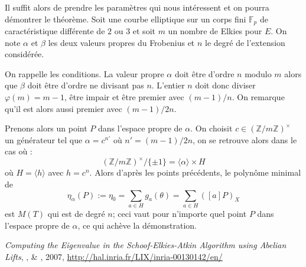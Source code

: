 \documentclass[a4paper]{article} %
\newcommand\zmodninv[1]{(\mathbb{Z}/#1\mathbb{Z})^{\times}}
\newcommand\GF[1]{\mathbb{F}_{#1}}
\newcommand\groupgen[1]{\langle{#1}\rangle}
\begin{document}
Il suffit alors de prendre les paramètres qui nous intéressent et on pourra
démontrer le théorème. Soit une courbe elliptique sur un corps fini $\GF{p}$ de
caractéristique différente de $2$ ou $3$ et soit $m$ un nombre de Elkies pour
$E$. On note $\alpha$ et $\beta$ les deux valeurs propres du Frobenius et $n$ le
degré de l'extension considérée.\par
On rappelle les conditions. La valeur propre $\alpha$ doit être d'ordre $n$
modulo $m$ alors que $\beta$ doit être d'ordre ne divisant pas $n$. L'entier $n$
doit donc diviser $\varphi(m) = m-1$, être impair et être premier avec $(m-1)/n$. 
On remarque qu'il est alors aussi premier avec $(m-1)/2n$.\par
Prenons alors un point $P$ dans l'espace propre de $\alpha$. On choisit
$c\in\zmodninv{m}$ un générateur tel que $\alpha = c^{n'}$ où $n' = (m-1)/2n$,
on se retrouve alors dans le cas où :
\[
\zmodninv{m}/\lbrace{\pm1\rbrace} = \groupgen{\alpha}\times H
\]
où $H = \groupgen{h}$ avec $h = c^n$. Alors d'après les points précédents, le
polynôme minimal de 
\[
\eta_{\alpha}(P) := \eta_0 = \sum_{a\in H}{g_a(\theta)} = \sum_{a\in
H}{([a]P)_X}
\]
est $M(T)$ qui est de degré $n$; ceci vaut pour n'importe quel point $P$ dans
l'espace propre de $\alpha$, ce qui achève la démonstration.


\begin{thebibliography}{LC}

 \emph{Computing the Eigenvalue in the Schoof-Elkies-Atkin
Algorithm using Abelian Lifts}, ,  \&
, 2007, 
\url{http://hal.inria.fr/LIX/inria-00130142/en/}

\end{thebibliography}
\end{document}
